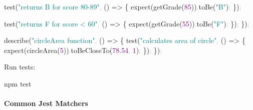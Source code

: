 \documentclass[
  justified,
  openright,
]{tufte-book}
\let\subsubsection\paragraph
\let\paragraph\paragraph
\newcommand{\DecValTok}[1]{\textcolor{Purple}{#1}}
\newcommand{\ExtensionTok}[1]{#1}
\newcommand{\FloatTok}[1]{\textcolor{Purple}{#1}}
\newcommand{\FunctionTok}[1]{\textcolor{BrandBlue}{#1}}
\newcommand{\KeywordTok}[1]{\textcolor{BrandBlue}{#1}}
\newcommand{\NormalTok}[1]{#1}
\newcommand{\OperatorTok}[1]{\textcolor{DarkGray}{#1}}
\newcommand{\StringTok}[1]{\textcolor{Teal}{#1}}
\newenvironment{Shaded}{%
  \begin{snugshade}
}{%
  \end{snugshade}
}
\let\subsubsection\paragraph
\let\paragraph\paragraph
\begin{document}
\begin{Shaded}
\begin{Highlighting}[]
  \FunctionTok{test}\NormalTok{(}\StringTok{"returns B for score 80{-}89"}\OperatorTok{,}\NormalTok{ () }\KeywordTok{=\textgreater{}}\NormalTok{ \{}
    \FunctionTok{expect}\NormalTok{(}\FunctionTok{getGrade}\NormalTok{(}\DecValTok{85}\NormalTok{))}\OperatorTok{.}\FunctionTok{toBe}\NormalTok{(}\StringTok{"B"}\NormalTok{)}\OperatorTok{;}
\NormalTok{  \})}\OperatorTok{;}

  \FunctionTok{test}\NormalTok{(}\StringTok{"returns F for score \textless{} 60"}\OperatorTok{,}\NormalTok{ () }\KeywordTok{=\textgreater{}}\NormalTok{ \{}
    \FunctionTok{expect}\NormalTok{(}\FunctionTok{getGrade}\NormalTok{(}\DecValTok{55}\NormalTok{))}\OperatorTok{.}\FunctionTok{toBe}\NormalTok{(}\StringTok{"F"}\NormalTok{)}\OperatorTok{;}
\NormalTok{  \})}\OperatorTok{;}
\NormalTok{\})}\OperatorTok{;}

\FunctionTok{describe}\NormalTok{(}\StringTok{"circleArea function"}\OperatorTok{,}\NormalTok{ () }\KeywordTok{=\textgreater{}}\NormalTok{ \{}
  \FunctionTok{test}\NormalTok{(}\StringTok{"calculates area of circle"}\OperatorTok{,}\NormalTok{ () }\KeywordTok{=\textgreater{}}\NormalTok{ \{}
    \FunctionTok{expect}\NormalTok{(}\FunctionTok{circleArea}\NormalTok{(}\DecValTok{5}\NormalTok{))}\OperatorTok{.}\FunctionTok{toBeCloseTo}\NormalTok{(}\FloatTok{78.54}\OperatorTok{,} \DecValTok{1}\NormalTok{)}\OperatorTok{;}
\NormalTok{  \})}\OperatorTok{;}
\NormalTok{\})}\OperatorTok{;}
\end{Highlighting}
\end{Shaded}

Run tests:

\begin{Shaded}
\begin{Highlighting}[]
\ExtensionTok{npm}\NormalTok{ test}
\end{Highlighting}
\end{Shaded}

\subsubsection{Common Jest Matchers}\label{common-jest-matchers}
\end{document}

